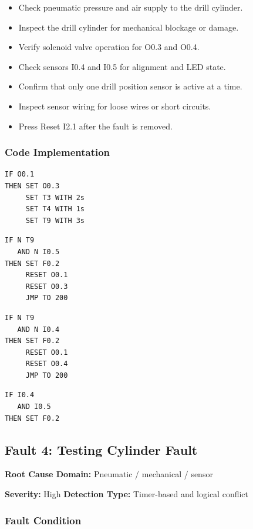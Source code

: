 \begin{itemize}
    \item Check pneumatic pressure and air supply to the drill cylinder.
    \item Inspect the drill cylinder for mechanical blockage or damage.
    \item Verify solenoid valve operation for O0.3 and O0.4.
    \item Check sensors I0.4 and I0.5 for alignment and LED state.
    \item Confirm that only one drill position sensor is active at a time.
    \item Inspect sensor wiring for loose wires or short circuits.
    \item Press Reset I2.1 after the fault is removed.
\end{itemize}

\subsubsection{Code Implementation}

\begin{verbatim}
IF O0.1
THEN SET O0.3
     SET T3 WITH 2s
     SET T4 WITH 1s
     SET T9 WITH 3s
\end{verbatim}

\begin{verbatim}
IF N T9
   AND N I0.5
THEN SET F0.2
     RESET O0.1
     RESET O0.3
     JMP TO 200
\end{verbatim}

\begin{verbatim}
IF N T9
   AND N I0.4
THEN SET F0.2
     RESET O0.1
     RESET O0.4
     JMP TO 200
\end{verbatim}

\begin{verbatim}
IF I0.4
   AND I0.5
THEN SET F0.2
\end{verbatim}

\subsection{Fault 4: Testing Cylinder Fault}

\textbf{Root Cause Domain:} Pneumatic / mechanical / sensor

\textbf{Severity:} High \quad \textbf{Detection Type:} Timer-based and logical conflict

\subsubsection{Fault Condition}

